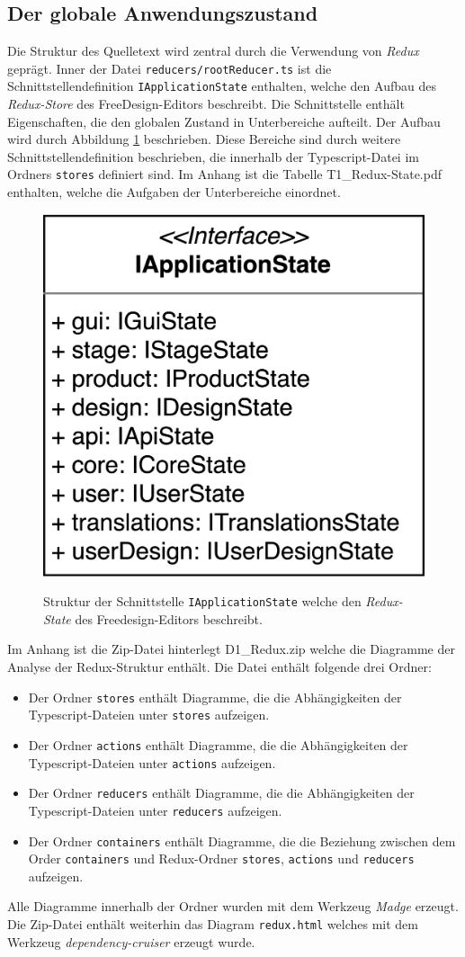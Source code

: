 \subsection{Der globale Anwendungszustand}
Die Struktur des Quelletext wird zentral durch die Verwendung von \emph{Redux} geprägt. Inner der Datei \lstinline|reducers/rootReducer.ts| ist die Schnittstellendefinition \lstinline|IApplicationState| enthalten, welche den Aufbau des \emph{Redux-Store} des FreeDesign-Editors beschreibt. Die Schnittstelle enthält Eigenschaften, die den globalen Zustand in Unterbereiche aufteilt. Der Aufbau wird durch Abbildung \ref{fig:IApplicationState} beschrieben. Diese Bereiche sind durch weitere Schnittstellendefinition beschrieben, die innerhalb der Typescript-Datei im Ordners \lstinline|stores| definiert sind. 
Im Anhang ist die Tabelle T1\_Redux-State.pdf enthalten, welche die Aufgaben der Unterbereiche einordnet. 


\begin{figure}[H]
    \centering
    \caption{Struktur der Schnittstelle \lstinline|IApplicationState| welche den \emph{Redux-State} des Freedesign-Editors beschreibt.}
    \includegraphics[width=.3\textwidth]{diagrams/Ist-Architektur/IApplicationState.png}
    \label{fig:IApplicationState}
\end{figure}


Im Anhang ist die Zip-Datei hinterlegt D1\_Redux.zip welche die Diagramme der Analyse der Redux-Struktur enthält.
Die Datei enthält folgende drei Ordner:  
\begin{itemize}
    \item Der Ordner \lstinline|stores| enthält Diagramme, die die Abhängigkeiten der Typescript-Dateien unter \lstinline|stores| aufzeigen.
    \item Der Ordner \lstinline|actions| enthält Diagramme, die die Abhängigkeiten der Typescript-Dateien unter \lstinline|actions| aufzeigen.
    \item Der Ordner \lstinline|reducers| enthält Diagramme, die die Abhängigkeiten der Typescript-Dateien unter \lstinline|reducers| aufzeigen. 
    \item Der Ordner \lstinline|containers| enthält Diagramme, die die Beziehung zwischen dem Order \lstinline|containers| und Redux-Ordner \lstinline|stores|, \lstinline|actions| und \lstinline|reducers| aufzeigen.
\end{itemize}
Alle Diagramme innerhalb der Ordner wurden mit dem Werkzeug \emph{Madge} erzeugt.
Die Zip-Datei enthält weiterhin das Diagram \lstinline|redux.html| welches mit dem Werkzeug \emph{dependency-cruiser} erzeugt wurde.

